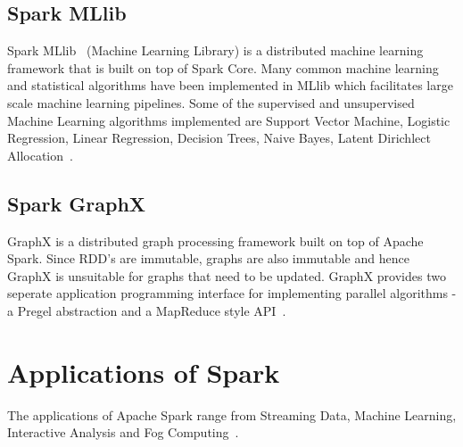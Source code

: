\subsection{Spark MLlib}
Spark MLlib~\cite{hid-sp18-408-Mllib} (Machine Learning Library) 
is a distributed machine learning 
framework that is built on top of Spark Core. Many common machine learning and 
statistical algorithms have been implemented in MLlib which facilitates large 
scale machine learning pipelines. Some of the supervised and unsupervised 
Machine Learning algorithms implemented are Support Vector Machine, Logistic 
Regression, Linear Regression, Decision Trees, Naive Bayes, Latent Dirichlect 
Allocation~\cite{hid-sp18-408-Spark}.


\subsection{Spark GraphX}
GraphX is a distributed graph processing framework built on top of Apache Spark. 
Since RDD's are immutable, graphs are also immutable and hence GraphX is 
unsuitable for graphs that need to be updated. GraphX provides two seperate 
application programming interface for implementing parallel algorithms - a 
Pregel abstraction and a MapReduce style API~\cite{hid-sp18-408-Spark}.


\section{Applications of Spark}

The applications of Apache Spark range from Streaming Data, Machine Learning, 
Interactive Analysis and Fog Computing~\cite{hid-sp18-408-fog}.


